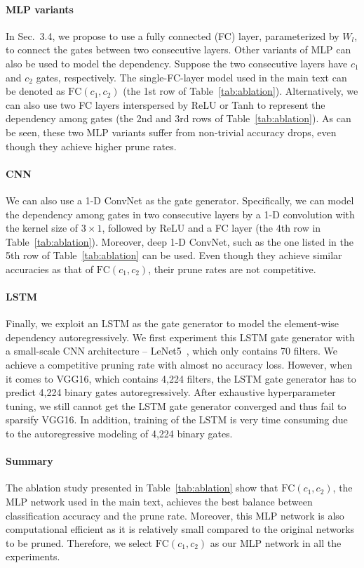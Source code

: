 \documentclass[runningheads, envcountsame, a4paper]{llncs}
\begin{document}
\paragraph{MLP variants}
In Sec.~3.4, we propose to use a fully connected (FC) layer, parameterized by $W_l$, to connect the gates between two consecutive layers. Other variants of MLP can also be used to model the dependency. Suppose the two consecutive layers have $c_1$ and $c_2$ gates, respectively. The single-FC-layer model used in the main text can be denoted as $\text{FC}(c_1,c_2)$ (the 1st row of Table~\ref{tab:ablation}). Alternatively, we can also use two FC layers interspersed by ReLU or Tanh to represent the dependency among gates (the 2nd and 3rd rows of Table~\ref{tab:ablation}). As can be seen, these two MLP variants suffer from non-trivial accuracy drops, even though they achieve higher prune rates.

\paragraph{CNN}
We can also use a 1-D ConvNet as the gate generator. Specifically, we can model the dependency among gates in two consecutive layers by a 1-D convolution with the kernel size of $3\times 1$, followed by ReLU and a FC layer (the 4th row in Table~\ref{tab:ablation}). Moreover, deep 1-D ConvNet, such as the one listed in the 5th row of Table~\ref{tab:ablation} can be used. Even though they achieve similar accuracies as that of $\text{FC}(c_1,c_2)$, their prune rates are not competitive.

\paragraph{LSTM}
Finally, we exploit an LSTM as the gate generator to model the element-wise dependency autoregressively. We first experiment this LSTM gate generator with a small-scale CNN architecture -- LeNet5~\cite{lecun1998gradient}, which only contains 70 filters. We achieve a competitive pruning rate with almost no accuracy loss. However, when it comes to VGG16, which contains 4,224 filters, the LSTM gate generator has to predict 4,224 binary gates autoregressively. After exhaustive hyperparameter tuning, we still cannot get the LSTM gate generator converged and thus fail to sparsify VGG16. In addition, training of the LSTM is very time consuming due to the autoregressive modeling of 4,224 binary gates.

\paragraph{Summary}
The ablation study presented in Table~\ref{tab:ablation} show that $\text{FC}(c_1,c_2)$, the MLP network used in the main text, achieves the best balance between classification accuracy and the prune rate. Moreover, this MLP network is also computational efficient as it is relatively small compared to the original networks to be pruned. Therefore, we select $\text{FC}(c_1,c_2)$ as our MLP network in all the experiments.
\end{document}
